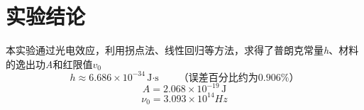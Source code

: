 \documentclass[12pt,a4paper]{article}
\begin{document}
	\section{实验结论}
	本实验通过光电效应，利用拐点法、线性回归等方法，求得了普朗克常量\textit{h}、材料的逸出功\textit{A}和红限值$\textit{v}_{0}$
	$$h \approx 6.686 \times 10^{-34} \, \text{J·s} \quad \quad \text{（误差百分比约为0.906\%）}$$
	\[
		A = 2.068 \times 10^{-19} \, \text{J}
	\]
	\[
	\nu_0 = 3.093 \times 10^{14} Hz
	\]
\end{document}
